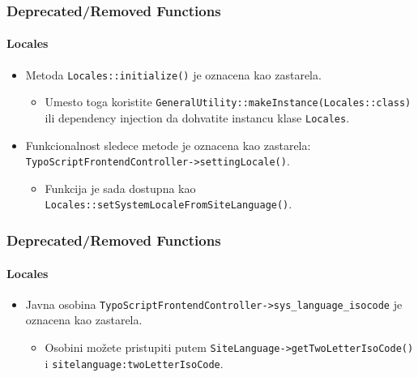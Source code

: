 \begin{frame}[fragile]
	\frametitle{Deprecated/Removed Functions}
	\framesubtitle{Locales}

	\begin{itemize}
		\item Metoda \texttt{Locales::initialize()} je oznacena kao zastarela.

			\begin{itemize}\smaller
				\item[\ding{228}] Umesto toga koristite \texttt{GeneralUtility::makeInstance(Locales::class)} ili
				dependency injection da dohvatite instancu klase \texttt{Locales}.
			\end{itemize}\normalsize

		\item Funkcionalnost sledece metode je oznacena kao zastarela:\newline
			\texttt{TypoScriptFrontendController->settingLocale()}.

			\begin{itemize}\smaller
				\item[\ding{228}] Funkcija je sada dostupna kao
				{\fontsize{8}{8} \selectfont \texttt{Locales::setSystemLocaleFromSiteLanguage()}.}
			\end{itemize}\normalsize

	\end{itemize}

\end{frame}


\begin{frame}[fragile]
	\frametitle{Deprecated/Removed Functions}
	\framesubtitle{Locales}

	\begin{itemize}
		\item Javna osobina \texttt{TypoScriptFrontendController->sys\_language\_isocode}
			je oznacena kao zastarela.

			\begin{itemize}\smaller
				\item[\ding{228}] Osobini možete pristupiti putem \texttt{SiteLanguage->getTwoLetterIsoCode()}
				i \texttt{sitelanguage:twoLetterIsoCode}.
			\end{itemize}\normalsize

	\end{itemize}

\end{frame}

